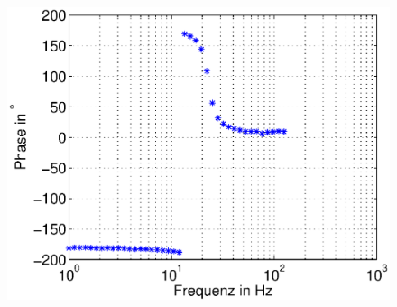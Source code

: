 \begin{frame}
\begin{columns}[c]
\begin{figure}[H]
\begin{center}
            \includegraphics[scale=0.3]{./img/plots/Auf_4_bode_rechts_ph.eps}
    \end{center}
    \end{figure}
\end{columns}
\end{frame}

